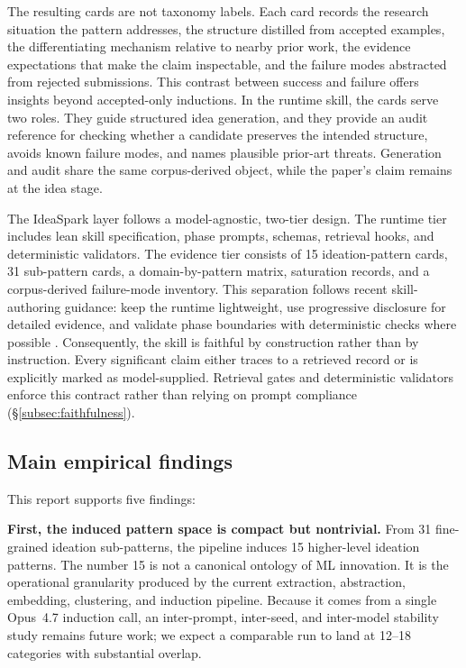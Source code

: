 \documentclass[10pt,a4paper]{article}
\begin{document}
The resulting cards are not taxonomy labels. Each card records the research situation the pattern addresses, the structure distilled from accepted examples, the differentiating mechanism relative to nearby prior work, the evidence expectations that make the claim inspectable, and the failure modes abstracted from rejected submissions. This contrast between success and failure offers insights beyond accepted-only inductions. In the runtime skill, the cards serve two roles. They guide structured idea generation, and they provide an audit reference for checking whether a candidate preserves the intended structure, avoids known failure modes, and names plausible prior-art threats. Generation and audit share the same corpus-derived object, while the paper's claim remains at the idea stage.

The IdeaSpark layer follows a model-agnostic, two-tier design. The runtime tier includes lean skill specification, phase prompts, schemas, retrieval hooks, and deterministic validators. The evidence tier consists of 15 ideation-pattern cards, 31 sub-pattern cards, a domain-by-pattern matrix, saturation records, and a corpus-derived failure-mode inventory. This separation follows recent skill-authoring guidance: keep the runtime lightweight, use progressive disclosure for detailed evidence, and validate phase boundaries with deterministic checks where possible \cite{anthropic_skill_bp_2025,schick2023toolformer,wei2022cot,yao2023react}. Consequently, the skill is faithful by construction rather than by instruction. Every significant claim either traces to a retrieved record or is explicitly marked as model-supplied. Retrieval gates and deterministic validators enforce this contract rather than relying on prompt compliance (\S\ref{subsec:faithfulness}).

\subsection{Main empirical findings}

This report supports five findings:

\textbf{First, the induced pattern space is compact but nontrivial.} From 31 fine-grained ideation sub-patterns, the pipeline induces 15 higher-level ideation patterns. The number 15 is not a canonical ontology of ML innovation. It is the operational granularity produced by the current extraction, abstraction, embedding, clustering, and induction pipeline. Because it comes from a single Opus~4.7 induction call, an inter-prompt, inter-seed, and inter-model stability study remains future work; we expect a comparable run to land at 12--18 categories with substantial overlap.
\end{document}
